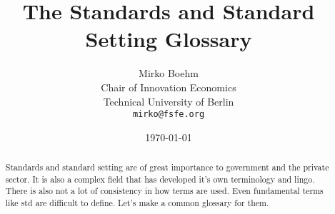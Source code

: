 \documentclass[a4paper]{article}
\title{The Standards and Standard Setting Glossary}
\author{Mirko Boehm\\
  Chair of Innovation Economics\\
  Technical University of Berlin\\
  \texttt{mirko@fsfe.org}}
\date{\today}
\begin{document}
\maketitle \thispagestyle{empty}
\begin{abstract}
  \noindent
  Standards and standard setting are of great importance to government
  and the private sector. It is also a complex field that has
  developed it's own terminology and lingo. There is also not a lot of
  consistency in how terms are used. Even fundamental terms like
  \gls{std} are difficult to define. Let's make a common glossary for
  them.
\end{abstract}

\clearpage
\glsaddall
\printnoidxglossary[type=\acronymtype,nonumberlist]
\clearpage
\printnoidxglossary[nonumberlist]
\clearpage

\end{document}
